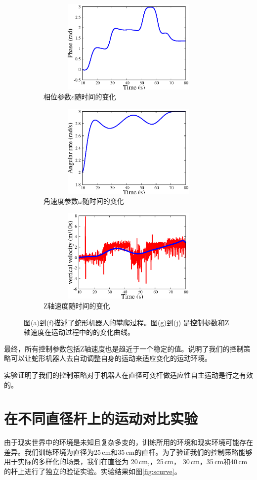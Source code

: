 \begin{figure}[htbp]
\begin{subfigure}{0.45\textwidth}{
			\centering
			\includegraphics[width=1\textwidth,height=130pt]{figure/chap05/BSB/p.eps}
			\caption{相位参数$\varepsilon$随时间的变化}
			\label{fig:bsp}
		}
	\end{subfigure}
	\begin{subfigure}{0.45\textwidth}{
			\centering
			\includegraphics[width=1\textwidth,height=130pt]{figure/chap05/BSB/w.eps}
			\caption{角速度参数$\omega$随时间的变化}
			\label{fig:bsw}
		}
	\end{subfigure}
	\begin{subfigure}{0.45\textwidth}{
			\centering
			\includegraphics[width=1\textwidth,height=130pt]{figure/chap05/BSB/v}
			\caption{Z轴速度随时间的变化}
			\label{fig:bsv}
		}
	\end{subfigure}
	\caption{图(a)到(f)描述了蛇形机器人的攀爬过程。图(g)到(j) 是控制参数和Z轴速度在运动过程中的的变化曲线。}
	\label{fig:BSB}
\end{figure}


最终，所有控制参数包括Z轴速度也是趋近于一个稳定的值。说明了我们的控制策略可以让蛇形机器人去自动调整自身的运动来适应变化的运动环境。

实验证明了我们的控制策略对于机器人在直径可变杆做适应性自主运动是行之有效的。


\section{在不同直径杆上的运动对比实验}

由于现实世界中的环境是未知且复杂多变的，训练所用的环境和现实环境可能存在差异。我们训练环境为直径为25\,cm和35\,cm的直杆。为了验证我们的控制策略能够用于实际的多样化的场景，我们在直径为 20\,cm,，25\,cm， 30\,cm，35\,cm和40\,cm的杆上进行了独立的验证实验。实验结果如图\ref{fig:scurve}。

